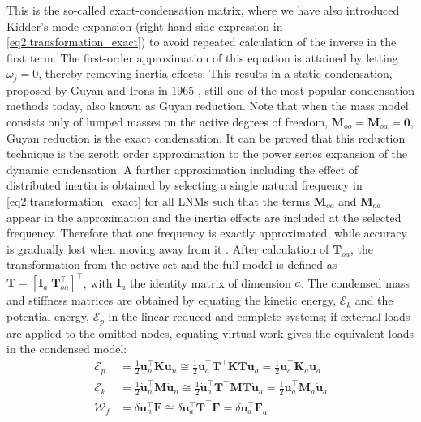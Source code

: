 \documentclass[11pt]{article}
\begin{document}
This is the so-called exact-condensation matrix, where we have also introduced Kidder's mode expansion \cite{Qu2010} (right-hand-side expression in \eqref{eq2:transformation_exact}) to avoid repeated calculation of the inverse in the first term. The first-order approximation of this equation is attained by letting $\omega_j =0$, thereby removing inertia effects. This results in a static condensation, proposed by Guyan and Irons in 1965 \cite{Guyan1965}, still one of the most popular condensation methods today, also known as Guyan reduction. Note that when the mass model consists only of lumped masses on the active degrees of freedom, $\pmb{M}_{oo} = \pmb{M}_{oa} = \pmb{0}$, Guyan reduction is the exact condensation.  It can be proved \cite{Qu2010} that this reduction technique is the zeroth order approximation to the power series expansion of the dynamic condensation.  A further approximation including the effect of distributed inertia is obtained by selecting a single natural frequency in  \eqref{eq2:transformation_exact} for all LNMs such that the terms $\pmb{M}_{oo}$ and $\pmb{M}_{oa}$ appear in the approximation and the inertia effects are included at the selected frequency. Therefore that one frequency is exactly approximated, while accuracy is gradually lost when moving away from it . After calculation of $\pmb{T}_{oa}$, the transformation from the active set and the full model is defined as $\pmb{T} =[\pmb{I}_a \; \pmb{T}_{oa}^\top]^\top$, with $\pmb{I}_a$ the identity matrix of dimension $a$. The condensed mass and stiffness matrices are obtained by equating the kinetic energy, $\mathcal{E}_k$ and the potential energy, $\mathcal{E}_p$ in the linear reduced and complete systems; if external loads are applied to the omitted nodes, equating virtual work gives the equivalent loads in the condensed model:
\begin{equation}\label{eq2:energy_condensed_matrices}
\begin{split}
\mathcal{E}_p &= \frac{1}{2}\bm{u}_n^\top\bm{K}\bm{u}_n \cong \frac{1}{2}\bm{u}_a^\top\bm{T}^\top\bm{K}\bm{T}\bm{u}_a = \frac{1}{2}\bm{u}_a^\top\bm{K}_a\bm{u}_a \\
\mathcal{E}_k &= \frac{1}{2}\dot{\bm{u}}_n^\top\bm{M}\dot{\bm{u}}_n \cong \frac{1}{2}\dot{\bm{u}}_a^\top\bm{T}^\top\bm{M}\bm{T}\dot{\bm{u}}_a = \frac{1}{2}\dot{\bm{u}}_a^\top\bm{M}_a\dot{\bm{u}}_a \\
\mathcal{W}_f &=\delta \bm{u}_n^\top \bm{F} \cong \delta \bm{u}_a^\top \bm{T}^\top \bm{F} = \delta \bm{u}_a^\top  \bm{F}_a 
\end{split}
\end{equation}
\end{document}
